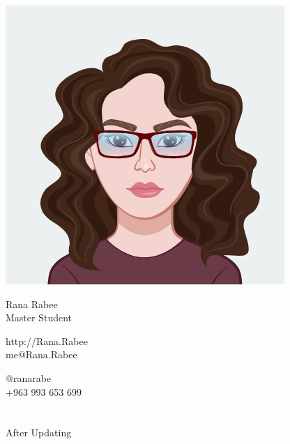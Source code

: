 \documentclass{article}
\begin{document}
\centering \includegraphics[width=.25\linewidth]{Avatar_logo}\\[5pt]
\parbox{2in}{\Large \centering Rana Rabee\\[1pt]
\normalsize Master Student}

\vfill
\raggedright
\begin{multicols}{2}
http://Rana.Rabee\\
me@Rana.Rabee

\columnbreak
\raggedleft
@ranarabe\\
+963 993 653 699%
\end{multicols}%



\section*{}
After Updating 
\end{document}
